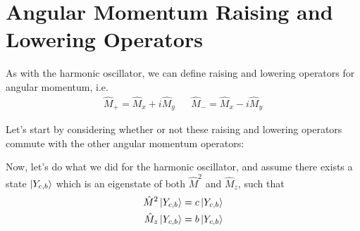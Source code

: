 \section*{Angular Momentum Raising and Lowering Operators}

	As with the harmonic oscillator, we can define raising and lowering operators for angular momentum, i.e.
	\begin{align*}
		\hat M_+ = \hat M_x + i\hat M_y & & \hat M_- = \hat M_x - i\hat M_y
	\end{align*}
	
	\begin{questions}
		\question Let's start by considering whether or not these raising and lowering operators commute with the other angular momentum operators:
			
		\contdnewpg
		
		\question Now, let's do what we did for the harmonic oscillator, and assume there exists a state $\ket{Y_{c,b}}$ which is an eigenstate of both $\hat M^2$ and $\hat M_z$, such that
			\begin{align*}
				\hat M^2 \ket{Y_{c,b}} &= c \ket{Y_{c,b}} \\
				\hat M_z \ket{Y_{c,b}} &= b \ket{Y_{c,b}}
			\end{align*}
			
\end{questions}
